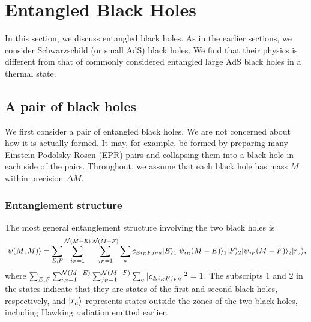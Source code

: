 \documentclass[12pt]{article}
\begin{document}
\section{Entangled Black Holes}
\label{sec:pair}

In this section, we discuss entangled black holes.  As in the earlier 
sections, we consider Schwarzschild (or small AdS) black holes. 
We find that their physics is different from that of commonly 
considered entangled large AdS black holes in a thermal state.


\subsection{A pair of black holes}
\label{subsec:BH-pair}

We first consider a pair of entangled black holes.  We are not 
concerned about how it is actually formed.  It may, for example, 
be formed by preparing many Einstein-Podolsky-Rosen (EPR) pairs 
and collapsing them into a black hole in each side of the pairs. 
Throughout, we assume that each black hole has mass $M$ within 
precision $\varDelta M$.

\subsubsection{Entanglement structure}
\label{subsubsec:pair-ent}

The most general entanglement structure involving the two black 
holes is
%
\begin{equation}
  \ket{\psi(M,M)} = \sum_{E,F} \sum_{i_E = 1}^{{\cal N}(M-E)} 
    \sum_{j_F = 1}^{{\cal N}(M-F)} \sum_a c_{E i_E F j_F a} 
    \ket{E}_1 \ket{\psi_{i_E}(M-E)}_1 
    \ket{F}_2 \ket{\psi_{j_F}(M-F)}_2 \ket{r_a},
\label{eq:BH-pair-gen}
\end{equation}
%
where $\sum_{E,F} \sum_{i_E = 1}^{{\cal N}(M-E)} 
\sum_{j_F = 1}^{{\cal N}(M-F)} \sum_a |c_{E i_E F j_F a}|^2 = 1$. 
The subscripts $1$ and $2$ in the states indicate that they are 
states of the first and second black holes, respectively, and 
$| r_a \rangle$ represents states outside the zones of the two black 
holes, including Hawking radiation emitted earlier.
\end{document}

